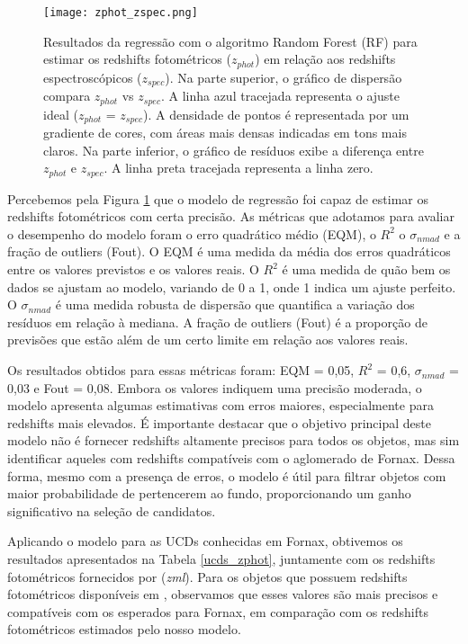 \begin{figure}[!ht]
    \centering
    \texttt{[image: zphot\_zspec.png]}
    \caption[]{Resultados da regressão com o algoritmo Random Forest (RF) para estimar os redshifts fotométricos (\textit{$z_{phot}$}) em relação aos redshifts espectroscópicos (\textit{$z_{spec}$}). Na parte superior, o gráfico de dispersão compara \textit{$z_{phot}$} vs \textit{$z_{spec}$}. A linha azul tracejada representa o ajuste ideal (\textit{$z_{phot}$} = \textit{$z_{spec}$}). A densidade de pontos é representada por um gradiente de cores, com áreas mais densas indicadas em tons mais claros. Na parte inferior, o gráfico de resíduos exibe a diferença entre \textit{$z_{phot}$} e \textit{$z_{spec}$}. A linha preta tracejada representa a linha zero.}
    \label{zphot_zspec}
\end{figure}

Percebemos pela Figura \ref{zphot_zspec} que o modelo de regressão foi capaz de estimar os redshifts fotométricos com certa precisão. As métricas que adotamos para avaliar o desempenho do modelo foram o erro quadrático médio (EQM), o $R^2$ o $\sigma_{nmad}$ e a fração de outliers (Fout). O EQM é uma medida da média dos erros quadráticos entre os valores previstos e os valores reais. O $R^2$ é uma medida de quão bem os dados se ajustam ao modelo, variando de 0 a 1, onde 1 indica um ajuste perfeito. O $\sigma_{nmad}$ é uma medida robusta de dispersão que quantifica a variação dos resíduos em relação à mediana. A fração de outliers (Fout) é a proporção de previsões que estão além de um certo limite em relação aos valores reais.

Os resultados obtidos para essas métricas foram: EQM = 0,05, $R^2$ = 0,6, $\sigma_{nmad}$ = 0,03 e Fout = 0,08. Embora os valores indiquem uma precisão moderada, o modelo apresenta algumas estimativas com erros maiores, especialmente para redshifts mais elevados. É importante destacar que o objetivo principal deste modelo não é fornecer redshifts altamente precisos para todos os objetos, mas sim identificar aqueles com redshifts compatíveis com o aglomerado de Fornax. Dessa forma, mesmo com a presença de erros, o modelo é útil para filtrar objetos com maior probabilidade de pertencerem ao fundo, proporcionando um ganho significativo na seleção de candidatos.

Aplicando o modelo para as UCDs conhecidas em Fornax, obtivemos os resultados apresentados na Tabela \ref{ucds_zphot}, juntamente com os redshifts fotométricos fornecidos por \cite{erik_photoz_2024} (\textit{zml}). Para os objetos que possuem redshifts fotométricos disponíveis em \cite{erik_photoz_2024}, observamos que esses valores são mais precisos e compatíveis com os esperados para Fornax, em comparação com os redshifts fotométricos estimados pelo nosso modelo.

